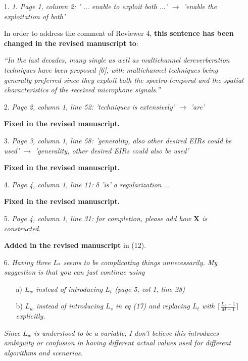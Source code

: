 \documentclass[10pt, a4paper]{article}
\begin{document}
\begin{itemize}

\item[1.] {\textit{1. Page 1, column 2: ' $\ldots$ enable to exploit both $\ldots$' $\rightarrow$ 'enable the exploitation of both'}} 

In order to address the comment of Reviewer 4, {\textbf{this sentence has been changed in the revised manuscript to}}:

{\emph{``In the last decades, many single as well as multichannel dereverberation techniques have been proposed [6], with multichannel techniques being generally preferred since they exploit both the spectro-temporal and the spatial characteristics of the received microphone signals.''}}

\item[2.] {\textit{Page 2, column 1, line 52: 'techniques is extensively' $\rightarrow$ 'are'}}

{\textbf{Fixed in the revised manuscript.}}

\item[3.] {\textit{Page 3, column 1, line 58: 'generality, also other desired EIRs could be used' $\rightarrow$ 'generality, other desired EIRs could also be used'}}

{\textbf{Fixed in the revised manuscript.}}

\item[4.] {\textit{Page 4, column 1, line 11: $\delta$ 'is' a regularization $\ldots$}}

{\textbf{Fixed in the revised manuscript.}}

\item[5.] {\textit{Page 4, column 1, line 31: for completion, please add how $\mathbf{X}$ is constructed.}}

{\textbf{Added in the revised manuscript}} in (12).

\item[6.] {\textit{Having three $L_*$ seems to be complicating things unnecessarily. My suggestion is that you can just continue using}}
      \begin{itemize}
        \item[a)]{\textit{$L_w$ instead of introducing $L_t$ (page 5, col 1, line 28)}}
        \item[b)]{\textit{$L_w$ instead of introducing $L_s$ in eq (17) and replacing $L_t$ with $\lceil \frac{L_h - 1}{M - 1} \rceil$ explicitly.}}
        \end{itemize}
    {\textit{Since $L_w$ is understood to be a variable, I don't believe this introduces ambiguity or confusion in having different actual values used for different algorithms and scenarios.}}


\end{itemize}
\end{document}
